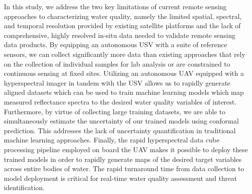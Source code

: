 \documentclass[remotesensing,article,submit,pdftex,moreauthors]{Definitions/mdpi}
\begin{document}
In this study, we address the two key limitations of current remote sensing approaches to characterizing water quality, namely the limited spatial, spectral, and temporal resolution provided by existing satellite platforms and the lack of comprehensive, highly resolved in-situ data needed to validate remote sensing data products. By equipping an autonomous USV with a suite of reference sensors, we can collect significantly more data than existing approaches that rely on the collection of individual samples for lab analysis or are constrained to continuous sensing at fixed sites. Utilizing an autonomous UAV equipped with a hyperspectral imager in tandem with the USV allows us to rapidly generate aligned datasets which can be used to train machine learning models which map measured reflectance spectra to the desired water quality variables of interest. Furthermore, by virtue of collecting large training datasets, we are able to simultaneously estimate the uncertainty of our trained models using conformal prediction. This addresses the lack of uncertainty quantification in traditional machine learning approaches. Finally, the rapid hyperspectral data cube processing pipeline employed on board the UAV makes it possible to deploy these trained models in order to rapidly generate maps of the desired target variables across entire bodies of water. The rapid turnaround time from data collection to model deployment is critical for real-time water quality assessment and threat identification. 



\vspace{6pt} 


\end{document}
